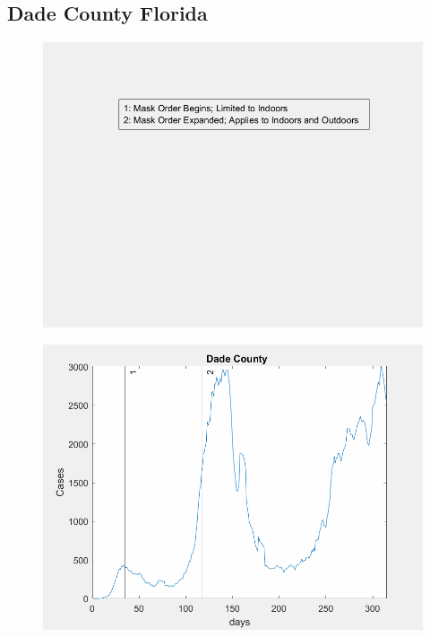 \documentclass[12pt]{article}
\begin{document}
\FloatBarrier

\subsection[Subtitle]{\large Dade County Florida}

\begin{figure}[!h]
	\includegraphics[width=\linewidth]{legends/dade_mask_order_legend.png}
	\caption{}
	\label{fig:legends/dade_mask_order_legendLabel}
\end{figure}

\begin{figure}[!h]
	\includegraphics[width=\linewidth]{images/dade_mask_order.png}
	\caption{}
	\label{fig:images/dade_mask_orderLabel}
\end{figure}
\end{document}
